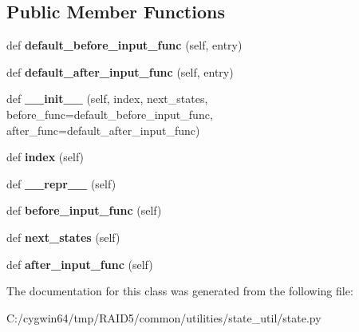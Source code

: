 \subsection*{Public Member Functions}
\begin{DoxyCompactItemize}
\item 
\mbox{\label{class_r_a_i_d5_1_1common_1_1utilities_1_1state__util_1_1state_1_1_state_ae2d90cae6b850f93d2a7ff49a750fe98}} 
def {\bfseries default\+\_\+before\+\_\+input\+\_\+func} (self, entry)
\item 
\mbox{\label{class_r_a_i_d5_1_1common_1_1utilities_1_1state__util_1_1state_1_1_state_aeb87db4b0d21fff38e60de9f8b7125f2}} 
def {\bfseries default\+\_\+after\+\_\+input\+\_\+func} (self, entry)
\item 
\mbox{\label{class_r_a_i_d5_1_1common_1_1utilities_1_1state__util_1_1state_1_1_state_a69665cfe04ad740ff2bf1a139ace439b}} 
def {\bfseries \+\_\+\+\_\+init\+\_\+\+\_\+} (self, index, next\+\_\+states, before\+\_\+func=default\+\_\+before\+\_\+input\+\_\+func, after\+\_\+func=default\+\_\+after\+\_\+input\+\_\+func)
\item 
\mbox{\label{class_r_a_i_d5_1_1common_1_1utilities_1_1state__util_1_1state_1_1_state_a94d09a7b55844250d05c6c869eb0e403}} 
def {\bfseries index} (self)
\item 
\mbox{\label{class_r_a_i_d5_1_1common_1_1utilities_1_1state__util_1_1state_1_1_state_a3f1a004b30689caf8de7a17c88609d6d}} 
def {\bfseries \+\_\+\+\_\+repr\+\_\+\+\_\+} (self)
\item 
\mbox{\label{class_r_a_i_d5_1_1common_1_1utilities_1_1state__util_1_1state_1_1_state_ae461e9de2a9f8792a3287c5bd3a39eb8}} 
def {\bfseries before\+\_\+input\+\_\+func} (self)
\item 
\mbox{\label{class_r_a_i_d5_1_1common_1_1utilities_1_1state__util_1_1state_1_1_state_ae33babc5dfd98fdc8cb91cd70ad733ba}} 
def {\bfseries next\+\_\+states} (self)
\item 
\mbox{\label{class_r_a_i_d5_1_1common_1_1utilities_1_1state__util_1_1state_1_1_state_a6495efa06f693391c6ebfd9d92607131}} 
def {\bfseries after\+\_\+input\+\_\+func} (self)
\end{DoxyCompactItemize}


The documentation for this class was generated from the following file\+:\begin{DoxyCompactItemize}
\item 
C\+:/cygwin64/tmp/\+R\+A\+I\+D5/common/utilities/state\+\_\+util/state.\+py\end{DoxyCompactItemize}
